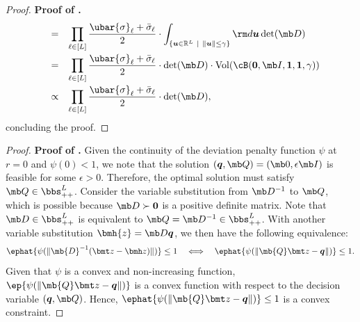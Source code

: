 \documentclass[mnsc, nonblindrev]{informswp}
\newcommand{\1}[1]{\mathds{1}{\left(#1\right)}}
\begin{document}
\begin{appendices}
\begin{proof}{\bf Proof of .}
$$\begin{array}{rcl}
& = & \displaystyle \prod_{\ell \in [L]} \frac{\ubar{\sigma}_{\ell} + \bar{\sigma}_{\ell}}{2} \cdot \int_{\{ \bm u \in \mathbb{R}^L ~|~ \| \bm u\| \leq \gamma \}} {\rm d} \bm u  \det(\mb D) \\[5mm]
& = & \displaystyle \prod_{\ell \in [L]} \frac{\ubar{\sigma}_{\ell} + \bar{\sigma}_{\ell}}{2} \cdot \det(\mb D) \cdot \mathrm{Vol}(\cB(\bm 0, \mb I, \bm 1, \bm 1,\gamma)) \\[5mm]
& \propto & \displaystyle \prod_{\ell \in [L]} \frac{\ubar{\sigma}_{\ell} + \bar{\sigma}_{\ell}}{2} \cdot \det(\mb D),
\end{array}
$$
concluding the proof.
\hfill \Halmos
\end{proof}
\vspace{3mm}

\begin{proof}{\bf Proof of .} 
Given the continuity of the deviation penalty function $\psi$ at $r=0$ and $\psi(0)<1$, we note that the solution $(\bm q, \mb Q) = (\mb 0, \epsilon \mb I)$ is feasible for some $\epsilon >0$. Therefore, the optimal solution must satisfy  $\mb Q \in \bbs^L_{++}$.  Consider the variable substitution from $\mb D^{-1}$ to  $\mb Q$, which is possible because $\mb D  \succ \bm 0$ is a positive definite matrix. Note that $\mb D \in  \bbs^{L}_{++}$ is equivalent to $\mb Q = \mb D^{-1} \in \bbs^{L}_{++}$. With another variable substitution $\bmh{z} = \mb D\bm{q}$, we then have the following equivalence:
$$
\ephat{\psi(\|\mb{D}^{-1}( \bmt z - \bmh z) \|)} \leq 1 
~~~\Longleftrightarrow~~~
\ephat{\psi(\|\mb{Q} \bmt z - \bm q \|)} \leq 1.
$$
Given that $\psi$ is a convex and non-increasing function, $\ep{\psi(\|\mb{Q} \bmt z - \bm q \|)}$ is a convex function with respect to the decision variable $(\bm q,\mb Q)$. Hence, $\ephat{\psi(\|\mb{Q} \bmt z - \bm q \|)} \leq 1$ is a convex constraint.


\end{proof}
\end{appendices}
\end{document}
